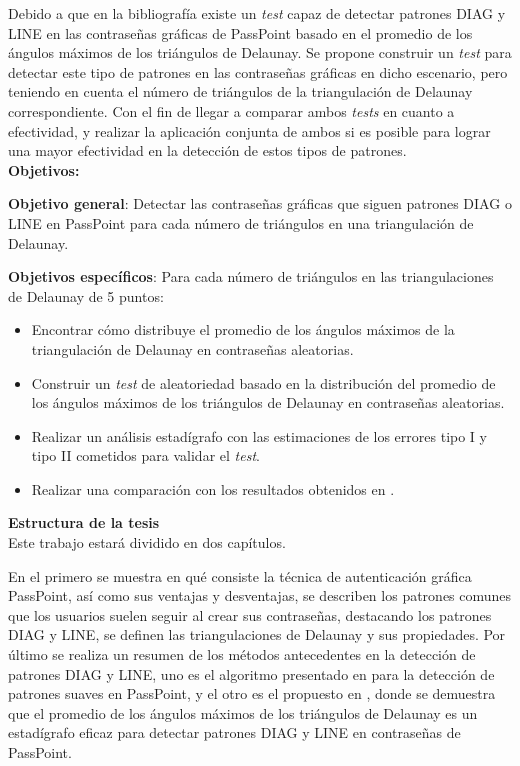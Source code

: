 \documentclass[12pt]{report}
\begin{document}
	\normalsize{
		Debido a que en la bibliografía existe un \textit{test} capaz de detectar patrones DIAG y LINE en las contraseñas gráficas de PassPoint basado en el promedio de los ángulos máximos de los triángulos de Delaunay. Se propone construir un \textit{test} para detectar este tipo de patrones en las contraseñas gráficas en dicho escenario, pero teniendo en cuenta el número de triángulos de la triangulación de Delaunay correspondiente. Con el fin de llegar a comparar ambos \textit{tests} en cuanto a efectividad, y realizar la aplicación conjunta de ambos si es posible para lograr una mayor efectividad en la detección de estos tipos de patrones.
		}\\

	\large{\textbf{Objetivos:}}
	
	\normalsize{\textbf{Objetivo general}}: Detectar las contraseñas gráficas que siguen patrones DIAG o LINE en PassPoint para cada número de triángulos en una triangulación de Delaunay.
	
	\normalsize{\textbf{Objetivos específicos}}:
	Para cada número de triángulos  en las triangulaciones de Delaunay de 5 puntos:
	
	\begin{itemize}
		\item Encontrar cómo distribuye el promedio de los ángulos máximos de la triangulación de Delaunay en contraseñas aleatorias.
		\item Construir un \textit{test} de aleatoriedad basado en la distribución del promedio de los ángulos máximos de los triángulos de Delaunay en contraseñas aleatorias.
		
		\item Realizar un análisis estadígrafo con las estimaciones de los errores tipo I y tipo II cometidos para validar el \textit{test}.
		
		\item Realizar una comparación con los resultados obtenidos en \cite{13}.
		
	\end{itemize}
	
	
	{\large{\textbf{Estructura de la tesis}}}\\
	
	Este trabajo estará dividido en dos capítulos.
	
	En el primero se muestra en qué consiste la técnica de autenticación gráfica PassPoint, así como sus ventajas y desventajas, se describen los patrones comunes que los usuarios suelen seguir al crear sus contraseñas, destacando los patrones DIAG y LINE, se definen las triangulaciones de Delaunay y sus propiedades. Por último se realiza un resumen  de los métodos antecedentes en la detección de patrones DIAG y LINE, uno es el algoritmo presentado en \cite{3} para la detección de patrones suaves en PassPoint, y el otro es el propuesto en \cite{13}, donde se demuestra que el promedio de los ángulos máximos de los  triángulos de Delaunay es un estadígrafo eficaz para detectar patrones DIAG y LINE en contraseñas de PassPoint.
	
\end{document}
